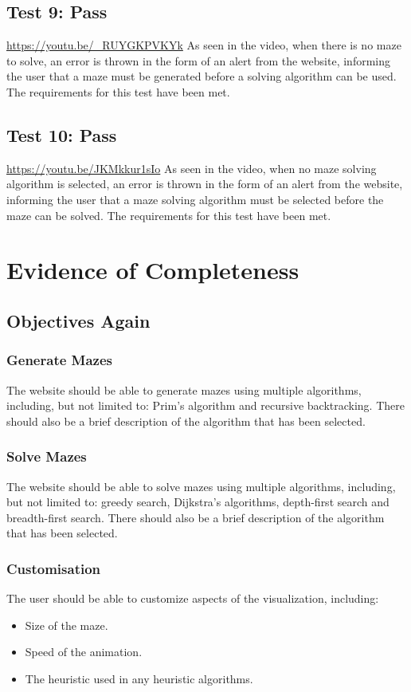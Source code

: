 \documentclass[titlepage]{article}
\begin{document}
\subsection{Test 9: Pass}
\url{https://youtu.be/_RUYGKPVKYk}
As seen in the video, when there is no maze to solve, an error is thrown in the form of an alert from the website, informing the user that a maze must be generated before a solving algorithm can be used. The requirements for this test have been met.

\subsection{Test 10: Pass}
\url{https://youtu.be/JKMkkur1sIo}
As seen in the video, when no maze solving algorithm is selected, an error is thrown in the form of an alert from the website, informing the user that a maze solving algorithm must be selected before the maze can be solved. The requirements for this test have been met.

\section{Evidence of Completeness}  
\subsection{Objectives Again}
\subsubsection{Generate Mazes}
The website should be able to generate mazes using multiple algorithms, including, but not limited to: Prim's algorithm and recursive backtracking. There should also be a brief description of the algorithm that has been selected.

\subsubsection{Solve Mazes}
The website should be able to solve mazes using multiple algorithms, including, but not limited to: greedy search, Dijkstra's algorithms, depth-first search and breadth-first search. There should also be a brief description of the algorithm that has been selected.

\subsubsection{Customisation}
The user should be able to customize aspects of the visualization, including:
\begin{itemize}
    \item Size of the maze.
    \item Speed of the animation.
    \item The heuristic used in any heuristic algorithms.
\end{itemize}
\end{document}
